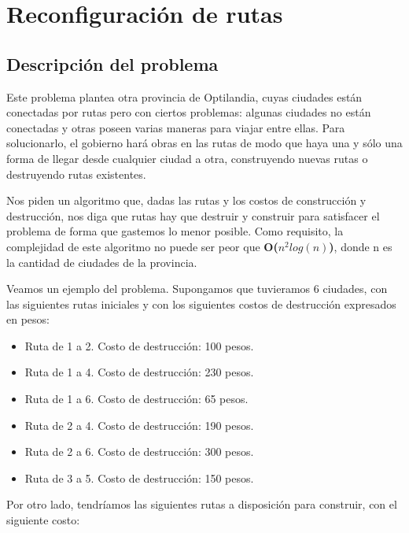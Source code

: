 \section{Reconfiguración de rutas}


\subsection{Descripción del problema}
Este problema plantea otra provincia de Optilandia, cuyas ciudades están conectadas por rutas pero con ciertos problemas: algunas ciudades no están conectadas y otras poseen varias maneras para viajar entre ellas. Para solucionarlo, el gobierno hará obras en las rutas de modo que haya una y sólo una forma de llegar desde cualquier ciudad a otra, construyendo nuevas rutas o destruyendo rutas existentes. 

Nos piden un algoritmo que, dadas las rutas y los costos de construcción y destrucción, nos diga que rutas hay que destruir y construir para satisfacer el problema de forma que gastemos lo menor posible. Como requisito, la complejidad de este algoritmo no puede ser peor que \textbf{O($n^2log(n)$)}, donde n es la cantidad de ciudades de la provincia.

Veamos un ejemplo del problema. Supongamos que tuvieramos 6 ciudades, con las siguientes rutas iniciales y con los siguientes costos de destrucción expresados en pesos:

\begin{itemize}
	\item Ruta de 1 a 2. Costo de destrucción: 100 pesos.

	\item Ruta de 1 a 4. Costo de destrucción: 230 pesos.

	\item Ruta de 1 a 6. Costo de destrucción: 65 pesos.

	\item Ruta de 2 a 4. Costo de destrucción: 190 pesos.

	\item Ruta de 2 a 6. Costo de destrucción: 300 pesos.

	\item Ruta de 3 a 5. Costo de destrucción: 150 pesos.
\end{itemize}

Por otro lado, tendríamos las siguientes rutas a disposición para construir, con el siguiente costo:

